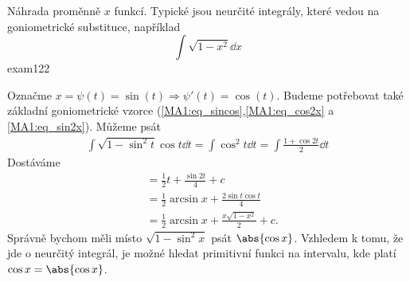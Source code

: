 \begin{mathexam}{Náhrada proměnně \(x\) funkcí. Typické jsou neurčité integrály, které vedou na
  goniometrické substituce, například \[\int\sqrt{1-x^2}\dd{x}\]}{exam122}
    
  Označme \(x=\psi(t)=\sin(t)  \Rightarrow \psi'(t)=\cos(t)\). Budeme potřebovat také základní
  goniometrické vzorce (\ref{MA1:eq_sincos},\ref{MA1:eq_cos2x} a \ref{MA1:eq_sin2x}). Můžeme psát
  \begin{gather*}
    \int\sqrt{1-\sin^2t}\cos t\dd{t} 
      = \int\cos^2 t \dd{t}  = \int\frac{1+\cos2t}{2}\dd{t}                         
  \end{gather*}
  Dostáváme
  \begin{align*}
      &= \frac{1}{2}t+\frac{\sin2t}{4}+c                       \\
      &= \frac{1}{2}\arcsin x + \frac{2\sin t\cos t}{4}        \\
      &= \frac{1}{2}\arcsin x + \frac{x\sqrt{1-x^2}}{2} + c.
  \end{align*}
  Správně bychom měli místo \(\sqrt{1 - \sin^2x}\) psát \(\abs{\cos x}\). Vzhledem k tomu, že jde o
  neurčitý integrál, je možné hledat primitivní funkci na intervalu, kde platí \(\cos x = \abs{\cos
  x}\).
\end{mathexam}